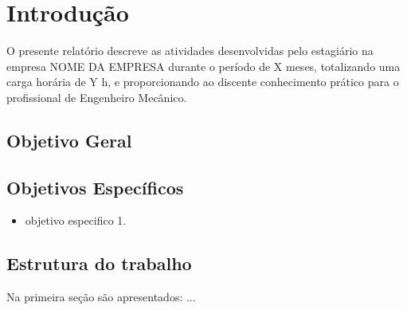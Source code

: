 \chapter{Introdução}\label{ch:introducao}

O presente relatório descreve as atividades desenvolvidas pelo estagiário na empresa
NOME DA EMPRESA durante o período de X meses, totalizando uma carga horária de Y h, e
proporcionando ao discente conhecimento prático para o profissional de Engenheiro Mecânico.

\section{Objetivo Geral}\label{sec:objetivogeral}


\section{Objetivos Específicos}\label{sec:objetivoesp}

	\begin{itemize}
		\item objetivo especifico 1.
	\end{itemize}

\section{Estrutura do trabalho}\label{sec:estruturatrab}

Na primeira seção são apresentados: ...
